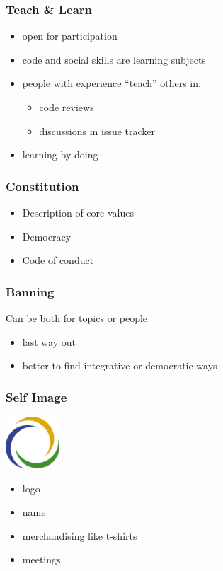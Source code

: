 \begin{frame}
	\frametitle{Teach \& Learn}

	\begin{itemize}[<+-| alert@+>]
		\item open for participation
		\item code and social skills are learning subjects
		\item people with experience ``teach'' others in:
		\begin{itemize}[<+-| alert@+>]
			\item code reviews
			\item discussions in issue tracker
		\end{itemize}
		\item learning by doing
	\end{itemize}
\end{frame}

\begin{frame}
	\frametitle{Constitution}
	\begin{itemize}
		\item Description of core values
		\item Democracy
		\item Code of conduct
	\end{itemize}
\end{frame}

\begin{frame}
	\frametitle{Banning}

	Can be both for topics or people

	\begin{itemize}
		\item last way out
		\item better to find integrative or democratic ways
	\end{itemize}
\end{frame}


\begin{frame}
	\frametitle{Self Image}

	\hfill \includegraphics[width=2cm]{../figures/logo}
	\begin{itemize}[<+-| alert@+>]
		\item logo
		\item name
		\item merchandising like t-shirts
		\item meetings
	\end{itemize}
\end{frame}

